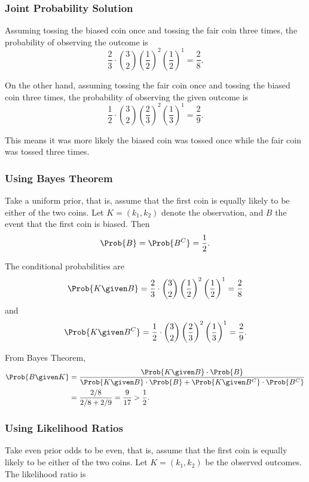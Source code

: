 \documentclass[12pt]{article}
\begin{document}
\subsubsection*{Joint Probability Solution}

Assuming tossing the biased coin once and tossing the fair coin three
times, the probability of observing the outcome is
\[
    \frac{2}{3} \cdot \binom{3}{2} \left( \frac{1}{2} \right)^2 \left(
    \frac{1}{2} \right)^1 = \frac{2}{8}.
\]

On the other hand, assuming tossing the fair coin once and tossing the
biased coin three times, the probability of observing the given outcome
is
\[
    \frac{1}{2} \cdot \binom{3}{2} \left( \frac{2}{3} \right)^2 \left(
    \frac{1}{3} \right)^1 = \frac{2}{9}.
\]

This means it was more likely the biased coin was tossed once
while the fair coin was tossed three times.

\subsubsection*{Using Bayes Theorem}

Take a uniform prior, that is, assume that the first coin is equally
likely to be either of the two coins.  Let \( K = (k_1, k_2) \) denote
the observation, and \( B \) the event that the first coin is biased.
Then
\[
    \Prob{B} = \Prob{B^C} = \frac{1}{2}.
\]

The conditional probabilities are
\[
    \Prob{K \given B} = \frac{2}{3} \cdot \binom{3}{2} \left( \frac{1}{2}
    \right)^2 \left( \frac{1}{2} \right)^1 = \frac{2}{8}
\] and
\[
    \Prob{K \given B^C} = \frac{1}{2} \cdot \binom{3}{2} \left( \frac{2}
    {3} \right)^2 \left( \frac{1}{3} \right)^1 = \frac{2}{9}.
\]

From Bayes Theorem,
\begin{align*}
    \Prob{B \given K} &= \frac{\Prob{K \given B} \cdot \Prob{B}}{\Prob{K
    \given B} \cdot \Prob{B} + \Prob{K \given B^C} \cdot \Prob{B^C}} \\
    &= \frac{2/8}{2/8 + 2/9} = \frac{9}{17} > \frac{1}{2}.
\end{align*}

\subsubsection*{Using Likelihood Ratios}

Take even prior odds to be even, that is, assume that the first coin is
equally likely to be either of the two coins.  Let \( K = (k_1, k_2) \)
be the observed outcomes.  The likelihood ratio is
\end{document}
